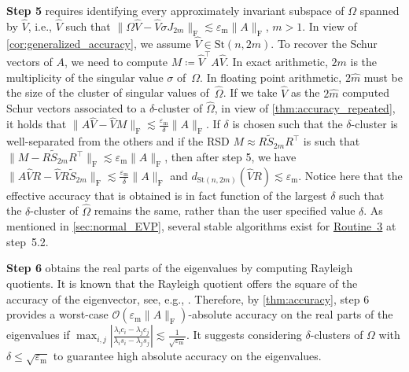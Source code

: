 \documentclass[10pt,twoside,dvipsnames]{siamart1116}
\numberwithin{algorithm}{section}
\numberwithin{equation}{section}
\newcommand{\wordref}[2]{\hyperlink{#1}{#2}}
\begin{document}
	\textbf{Step 5} requires identifying every approximately invariant subspace of $\Omega$ spanned by $\widehat{V}$, i.e., $\widehat{V}$ such that $\| \Omega \widehat{V} - \widehat{V}\sigma J_{2m}\|_\mathrm{F}\lesssim \varepsilon_\mathrm{m}\|A\|_\mathrm{F}$, $m > 1$. In view of \cref{cor:generalized_accuracy}, we assume $\widehat{V}\in\mathrm{St}(n,2m)$. To recover the Schur vectors of $A$, we need to compute $M\coloneq \widehat{V}^\top A\widehat{V}$. In exact arithmetic, $2m$ is the multiplicity of the singular value $\sigma$ of~$\Omega$. In floating point arithmetic, $2\widehat{m}$ must be the size of the cluster of singular values of~$\widehat{\Omega}$. 
	If we take $\widehat{V}$ as the $2\widehat{m}$ computed Schur vectors associated to a $\delta$-cluster of $\widehat{\Omega}$, in view of \cref{thm:accuracy_repeated}, it holds that $\|A\widehat{V} - \widehat{V} M\|_\mathrm{F}\lesssim \frac{\varepsilon_\mathrm{m}}{\delta}\|A\|_\mathrm{F}$. If $\delta$ is chosen such that the $\delta$-cluster is well-separated from the others and if the RSD $M \approx R \widetilde{S}_{2m} R^\top$ is such that $\|M - R \widetilde{S}_{2m} R^\top\|_\mathrm{F}\lesssim \varepsilon_\mathrm{m} \|A\|_\mathrm{F}$, then after step 5, we have  $\|A\widehat{V}R - \widehat{V}  R \widetilde{S}_{2m}\|_\mathrm{F}\lesssim \frac{\varepsilon_\mathrm{m}}{\delta}\|A\|_\mathrm{F}$ and $d_{\mathrm{St}(n,2m)}(\widehat{V}R)\lesssim \varepsilon_\mathrm{m}$. Notice here that the effective accuracy that is obtained is in fact function of the largest $\delta$ such that the $\delta$-cluster of $\widehat{\Omega}$ remains the same, rather than the user specified value $\delta$. As mentioned in \cref{sec:normal_EVP}, several stable algorithms exist for \wordref{oracle3}{Routine~3} at step~5.2. 
	
	\textbf{Step 6} obtains the real parts of the eigenvalues by computing Rayleigh quotients. It is known that the Rayleigh quotient offers the square of the accuracy of the eigenvector, see, e.g., \cite[Lecture~27]{trefethen97}. Therefore, by \cref{thm:accuracy}, step 6 provides a worst-case $\mathcal{O}(\varepsilon_\mathrm{m}\|A\|_\mathrm{F})$-absolute accuracy on the real parts of the eigenvalues if $\max_{i,j}\left|\frac{\lambda_i c_i - \lambda_j c_j}{\lambda_i s_i - \lambda_j s_j}\right|\lesssim \frac{1}{\sqrt{\varepsilon_\mathrm{m}}}$. It suggests considering $\delta$-clusters of $\Omega$ with $\delta\leq\sqrt{\varepsilon_\mathrm{m}}$ to guarantee high absolute accuracy on the eigenvalues. 
	
\end{document}
